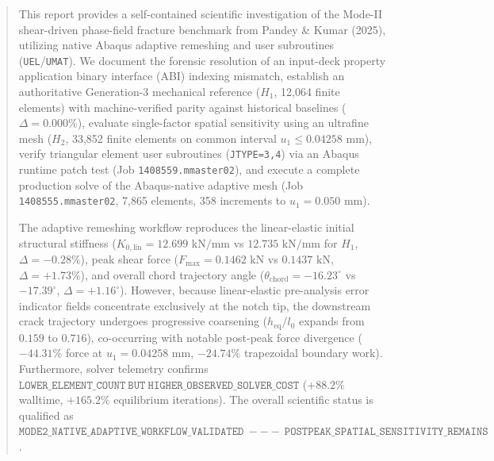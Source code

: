 \documentclass[11pt,a4paper]{article}
\begin{document}
\begin{abstract}
This report provides a self-contained scientific investigation of the Mode-II shear-driven phase-field fracture benchmark from Pandey \& Kumar (2025), utilizing native Abaqus adaptive remeshing and user subroutines (\texttt{UEL}/\texttt{UMAT}). We document the forensic resolution of an input-deck property application binary interface (ABI) indexing mismatch, establish an authoritative Generation-3 mechanical reference ($H_1$, 12,064 finite elements) with machine-verified parity against historical baselines ($\Delta = 0.000\%$), evaluate single-factor spatial sensitivity using an ultrafine mesh ($H_2$, 33,852 finite elements on common interval $u_1 \le 0.04258\text{ mm}$), verify triangular element user subroutines (\texttt{JTYPE=3,4}) via an Abaqus runtime patch test (Job \texttt{1408559.mmaster02}), and execute a complete production solve of the Abaqus-native adaptive mesh (Job \texttt{1408555.mmaster02}, 7,865 elements, 358 increments to $u_1 = 0.050\text{ mm}$). 

The adaptive remeshing workflow reproduces the linear-elastic initial structural stiffness ($K_{0,\mathrm{lin}} = 12.699\text{ kN/mm}$ vs $12.735\text{ kN/mm}$ for $H_1$, $\Delta = -0.28\%$), peak shear force ($F_{\max} = 0.1462\text{ kN}$ vs $0.1437\text{ kN}$, $\Delta = +1.73\%$), and overall chord trajectory angle ($\theta_{\mathrm{chord}} = -16.23^\circ$ vs $-17.39^\circ$, $\Delta = +1.16^\circ$). However, because linear-elastic pre-analysis error indicator fields concentrate exclusively at the notch tip, the downstream crack trajectory undergoes progressive coarsening ($h_{\mathrm{eq}}/l_0$ expands from $0.159$ to $0.716$), co-occurring with notable post-peak force divergence ($-44.31\%$ force at $u_1 = 0.04258\text{ mm}$, $-24.74\%$ trapezoidal boundary work). Furthermore, solver telemetry confirms $\mathtt{LOWER\_ELEMENT\_COUNT\ BUT\ HIGHER\_OBSERVED\_SOLVER\_COST}$ ($+88.2\%$ walltime, $+165.2\%$ equilibrium iterations). The overall scientific status is qualified as $\mathtt{MODE2\_NATIVE\_ADAPTIVE\_WORKFLOW\_VALIDATED\ --- \ POSTPEAK\_SPATIAL\_SENSITIVITY\_REMAINS}$.
\end{abstract}

\vspace{0.5cm}
\tableofcontents
\newpage

\end{document}
